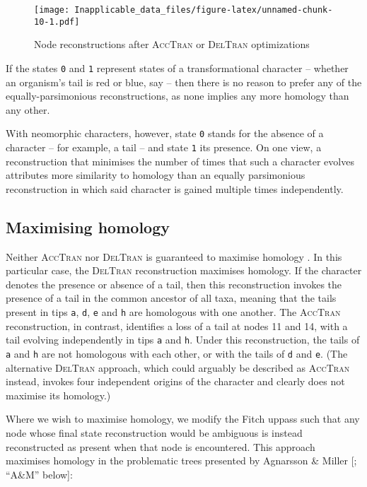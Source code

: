 \documentclass[]{book}
\theoremstyle{definition}
\theoremstyle{definition}
\theoremstyle{definition}
\theoremstyle{remark}
\begin{document}
\begin{figure}
\centering
\texttt{[image: Inapplicable\_data\_files/figure-latex/unnamed-chunk-10-1.pdf]}
\caption{\label{fig:unnamed-chunk-10}Node reconstructions after \textsc{AccTran} or
\textsc{DelTran} optimizations}
\end{figure}

If the states \texttt{0} and \texttt{1} represent states of a
transformational character -- whether an organism's tail is red or blue,
say -- then there is no reason to prefer any of the equally-parsimonious
reconstructions, as none implies any more homology than any other.

With neomorphic characters, however, state \texttt{0} stands for the
absence of a character -- for example, a tail -- and state \texttt{1}
its presence. On one view, a reconstruction that minimises the number of
times that such a character evolves attributes more similarity to
homology than an equally parsimonious reconstruction in which said
character is gained multiple times independently.

\subsection{Maximising homology}\label{maximising-homology}

Neither \textsc{AccTran} nor \textsc{DelTran} is guaranteed to maximise
homology \citep{Agnarsson2008}. In this particular case, the
\textsc{DelTran} reconstruction maximises homology. If the character
denotes the presence or absence of a tail, then this reconstruction
invokes the presence of a tail in the common ancestor of all taxa,
meaning that the tails present in tips \texttt{a}, \texttt{d},
\texttt{e} and \texttt{h} are homologous with one another. The
\textsc{AccTran} reconstruction, in contrast, identifies a loss of a
tail at nodes 11 and 14, with a tail evolving independently in tips
\texttt{a} and \texttt{h}. Under this reconstruction, the tails of
\texttt{a} and \texttt{h} are not homologous with each other, or with
the tails of \texttt{d} and \texttt{e}. (The alternative
\textsc{DelTran} approach, which could arguably be described as
\textsc{AccTran} instead, invokes four independent origins of the
character and clearly does not maximise its homology.)

Where we wish to maximise homology, we modify the Fitch uppass such that
any node whose final state reconstruction would be ambiguous is instead
reconstructed as present when that node is encountered. This approach
maximises homology in the problematic trees presented by Agnarsson \&
Miller {[}\citet{Agnarsson2008}; ``A\&M'' below{]}:
\end{document}
